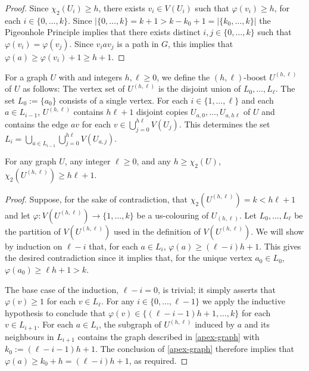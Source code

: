 \documentclass[kpfonts]{patmorin}
\newcommand{\uqs}{\chi_2}
\begin{document}
\begin{proof}
    Since $\uqs(U_i)\ge h$, there exists $v_i\in V(U_i)$ such that $\varphi(v_i)\ge h$, for each $i\in\{0,\ldots,k\}$.  Since $|\{0,\ldots,k\}=k+1>k-k_0+1=|\{k_0,\ldots,k\}|$ the Pigeonhole Principle implies that there exists distinct $i,j\in\{0,\ldots,k\}$ such that $\varphi(v_i)=\varphi(v_j)$.  Since $v_i a v_j$ is a path in $G$, this implies that $\varphi(a)\ge \varphi(v_i)+1\ge h+1$.
\end{proof}

For a graph $U$ with and integers $h,\ell\ge 0$, we define the $(h,\ell)$-boost $U^{(h,\ell)}$ of $U$ as follows: The vertex set of $U^{(h,\ell)}$ is the disjoint union of $L_0,\ldots,L_\ell$.  The set $L_0:=\{a_0\}$ consists of a single vertex. For each $i\in\{1,\ldots,\ell\}$ and each $a\in L_{i-1}$, $U^{(h,\ell)}$ contains $h\ell+1$ disjoint copies $U_{a,0},\ldots,U_{a,h\ell}$ of $U$ and contains the edge $av$ for each $v\in\bigcup_{j=0}^{h\ell} V(U_j)$.  This determines the set $L_i=\bigcup_{a\in L_{i-1}}\bigcup_{j=0}^{h\ell} V(U_{a,j})$.

\begin{lem}\label{boost}
    For any graph $U$, any integer $\ell\ge 0$, and any $h\ge\uqs(U)$, $\uqs(U^{(h,\ell)})\ge h\ell +1$.
\end{lem}

\begin{proof}
    Suppose, for the sake of contradiction, that $\uqs(U^{(h,\ell)})=k<h\ell+1$ and let $\varphi:V(U^{(h,\ell)})\to\{1,\ldots,k\}$ be a us-colouring of $U_{(h,\ell)}$.  Let $L_0,\ldots,L_{\ell}$ be the partition of $V(U^{(h,\ell)})$ used in the definition of $V(U^{(h,\ell)})$.
    We will show by induction on $\ell-i$ that, for each $a\in L_{i}$, $\varphi(a)\ge(\ell-i)h+1$. This gives the desired contradiction since it implies that, for the unique vertex $a_0\in L_0$, $\varphi(a_0)\ge \ell h+1 > k$.

    The base case of the induction, $\ell-i=0$, is trivial; it simply asserts that $\varphi(v)\ge 1$ for each $v\in L_\ell$.  For any $i\in\{0,\ldots,\ell-1\}$ we apply the inductive hypothesis to conclude that $\varphi(v)\in\{(\ell-i-1)h+1,\ldots,k\}$ for each $v\in L_{i+1}$.  For each $a\in L_i$, the subgraph of $U^{(h,\ell)}$ induced by $a$ and its neighbours in $L_{i+1}$ contains the graph described in \cref{apex-graph} with $k_0:=(\ell-i-1)h+1$.  The conclusion of \cref{apex-graph} therefore implies that $\varphi(a)\ge k_0+h=(\ell-i)h+1$, as required.
\end{proof}
\end{document}
